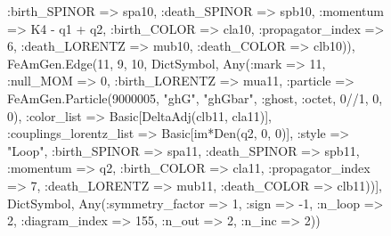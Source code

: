 \documentclass{revtex4}
\begin{document}
\begin{figure}[!htb]
\begin{center}
{:birth_SPINOR => spa10, :death_SPINOR => spb10, :momentum => K4 - q1 + q2, :birth_COLOR => cla10, :propagator_index => 6, :death_LORENTZ => mub10, :death_COLOR => clb10)), FeAmGen.Edge(11, 9, 10, Dict{Symbol, Any}(:mark => 11, :null_MOM => 0, :birth_LORENTZ => mua11, :particle => FeAmGen.Particle(9000005, "ghG", "ghGbar", :ghost, :octet, 0//1, 0, 0), :color_list => Basic[DeltaAdj(clb11, cla11)], :couplings_lorentz_list => Basic[im*Den(q2, 0, 0)], :style => "Loop", :birth_SPINOR => spa11, :death_SPINOR => spb11, :momentum => q2, :birth_COLOR => cla11, :propagator_index => 7, :death_LORENTZ => mub11, :death_COLOR => clb11))], Dict{Symbol, Any}(:symmetry_factor => 1, :sign => -1, :n_loop => 2, :diagram_index => 155, :n_out => 2, :n_inc => 2)) 
}
\end{center}
\end{figure}
\end{document}

